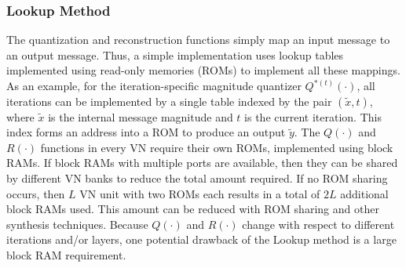 \documentclass [PhD] {uclathes}
\begin{document}
\subsubsection{Lookup Method}
The quantization and reconstruction functions simply map an input message to an output message.  Thus, a simple implementation uses lookup tables implemented using read-only memories (ROMs) to implement all these mappings.
As an example, for the iteration-specific magnitude quantizer $Q^{*(t)}(\cdot)$, all iterations can be implemented by a single table indexed by the pair $(\tilde{x},t)$, where $\tilde{x}$ is the internal message magnitude and $t$ is the current iteration. This index forms an address into a ROM to produce an output $\tilde{y}$.
The $Q(\cdot)$ and $R(\cdot)$ functions in every VN require their own ROMs, implemented using block RAMs. 
If block RAMs with multiple ports are available, then they can be shared by different VN banks to reduce the total amount required. If no ROM sharing occurs, then $L$ VN unit with two ROMs each results in a total of $2L$ additional block RAMs used. 
This amount can be reduced with ROM sharing and other synthesis techniques.
Because $Q(\cdot)$ and $R(\cdot)$ change with respect to different iterations and/or layers, one potential drawback of the Lookup method is a large block RAM requirement.  
\end{document}
